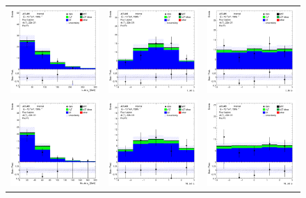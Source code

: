 \begin{figure}[htbp]
  \begin{tabular}{ccc}

    \includegraphics[width=.3\textwidth]{figures/PreFitPlots/lep4_ZZb_4T_LJet_pt.png} &
    \includegraphics[width=.3\textwidth]{figures/PreFitPlots/lep4_ZZb_4T_LJet_eta.png} &
    \includegraphics[width=.3\textwidth]{figures/PreFitPlots/lep4_ZZb_4T_LJet_phi.png} \\
    \includegraphics[width=.3\textwidth]{figures/PreFitPlots/lep4_ZZb_4T_NLJet_pt.png} &
    \includegraphics[width=.3\textwidth]{figures/PreFitPlots/lep4_ZZb_4T_NLJet_eta.png} &
    \includegraphics[width=.3\textwidth]{figures/PreFitPlots/lep4_ZZb_4T_NLJet_phi.png} \\


\end{tabular}
\end{figure}
